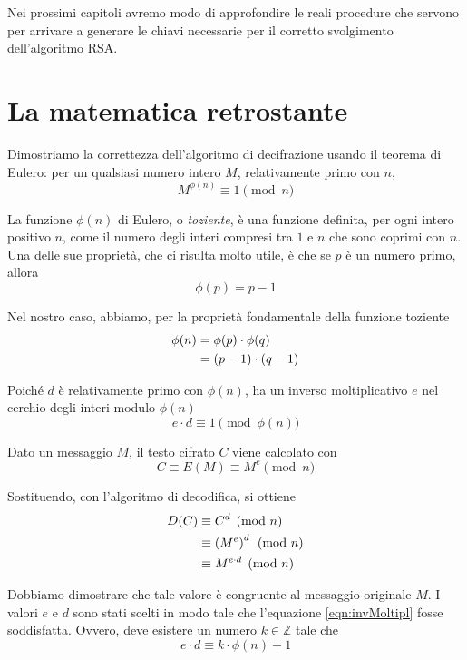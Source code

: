 Nei prossimi capitoli avremo modo di approfondire le reali procedure che servono per arrivare a generare le chiavi necessarie per il corretto svolgimento dell'algoritmo RSA.

%
\section{La matematica retrostante}

Dimostriamo la correttezza dell'algoritmo di decifrazione usando il teorema di Eulero: per un qualsiasi numero intero $M$, relativamente primo con $n$, 
\begin{equation}
	M^{\phi(n)} \equiv 1 \pmod{n}
\end{equation}

La funzione $\phi(n)$ di Eulero, o \emph{toziente}, è una funzione definita, per ogni intero positivo $n$, come il numero degli interi compresi tra $1$ e $n$ che sono coprimi con $n$. Una delle sue proprietà, che ci risulta molto utile, è che se $p$ è un numero primo, allora
\begin{equation}
	\label{eqn:toziente}
	\phi(p) = p - 1
\end{equation}

Nel nostro caso, abbiamo, per la proprietà fondamentale della funzione toziente
\begin{align}
	\phi(n) &= \phi(p) \cdot \phi(q) \notag \\
	&= (p-1) \cdot (q-1)
\end{align}

Poiché $d$ è relativamente primo con $\phi(n)$, ha un inverso moltiplicativo $e$ nel cerchio degli interi modulo $\phi(n)$
\begin{equation}
	\label{eqn:invMoltipl}
	e \cdot d \equiv 1 \pmod{\phi(n)}
\end{equation}

Dato un messaggio $M$, il testo cifrato $C$ viene calcolato con
\[C \equiv E(M) \equiv M^e \pmod{n}\]

Sostituendo, con l'algoritmo di decodifica, si ottiene
\begin{align}
	D(C) &\equiv	C^d \pmod{n} \notag\\
	&\equiv \left(M^e\right)^d \pmod{n} \notag\\
	&\equiv M^{e \cdot d} \pmod{n} \label{eqn:decod}
\end{align}

Dobbiamo dimostrare che tale valore è congruente al messaggio originale $M$. I valori $e$ e $d$ sono stati scelti in modo tale che l'equazione \eqref{eqn:invMoltipl} fosse soddisfatta. Ovvero, deve esistere un numero $k \in \mathbb{Z}$ tale che 
\begin{equation}
	e \cdot d \equiv k \cdot \phi(n) + 1
\end{equation}


